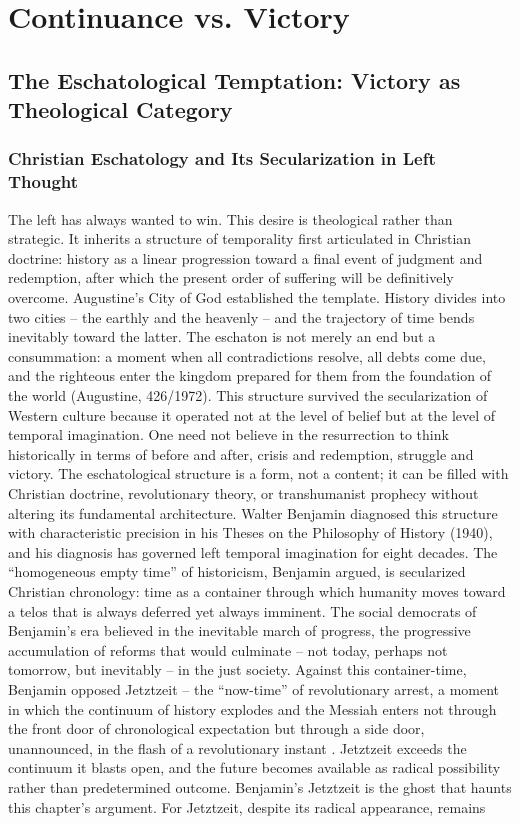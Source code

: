 \chapter{Continuance vs. Victory}
\label{ch:06}



\section{The Eschatological Temptation: Victory as Theological Category}

\subsection{Christian Eschatology and Its Secularization in Left Thought}

The left has always wanted to win. This desire is theological rather than strategic. It inherits a structure of temporality first articulated in Christian doctrine: history as a linear progression toward a final event of judgment and redemption, after which the present order of suffering will be definitively overcome. Augustine’s City of God established the template. History divides into two cities – the earthly and the heavenly – and the trajectory of time bends inevitably toward the latter. The eschaton is not merely an end but a consummation: a moment when all contradictions resolve, all debts come due, and the righteous enter the kingdom prepared for them from the foundation of the world (Augustine, 426/1972). This structure survived the secularization of Western culture because it operated not at the level of belief but at the level of temporal imagination. One need not believe in the resurrection to think historically in terms of before and after, crisis and redemption, struggle and victory. The eschatological structure is a form, not a content; it can be filled with Christian doctrine, revolutionary theory, or transhumanist prophecy without altering its fundamental architecture. Walter Benjamin diagnosed this structure with characteristic precision in his Theses on the Philosophy of History (1940), and his diagnosis has governed left temporal imagination for eight decades. The “homogeneous empty time” of historicism, Benjamin argued, is secularized Christian chronology: time as a container through which humanity moves toward a telos that is always deferred yet always imminent. The social democrats of Benjamin’s era believed in the inevitable march of progress, the progressive accumulation of reforms that would culminate – not today, perhaps not tomorrow, but inevitably – in the just society. Against this container-time, Benjamin opposed Jetztzeit – the “now-time” of revolutionary arrest, a moment in which the continuum of history explodes and the Messiah enters not through the front door of chronological expectation but through a side door, unannounced, in the flash of a revolutionary instant \cite[Thesis~XIV]{benjamin_1940}. Jetztzeit exceeds the continuum it blasts open, and the future becomes available as radical possibility rather than predetermined outcome. Benjamin’s Jetztzeit is the ghost that haunts this chapter’s argument. For Jetztzeit, despite its radical appearance, remains 